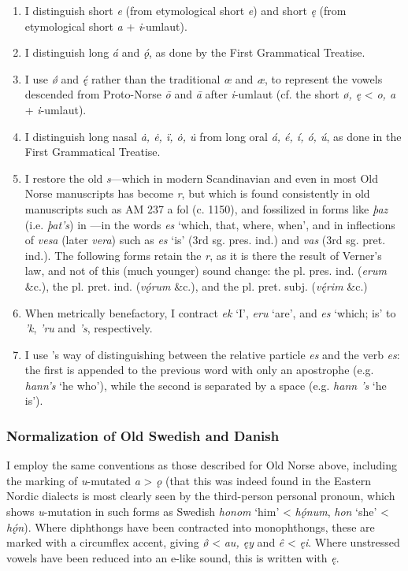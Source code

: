     \begin{enumerate}
    \item I distinguish short \emph{e} (from etymological short \emph{e}) and short \emph{ę} (from etymological short \emph{a} + \emph{i}-umlaut).
    \item I distinguish long \emph{á} and \emph{ǫ́}, as done by the First Grammatical Treatise.
    \item I use \emph{ǿ} and \emph{ę́} rather than the traditional \emph{œ} and \emph{æ}, to represent the vowels descended from Proto-Norse \emph{ō} and \emph{ā} after \emph{i}-umlaut (cf. the short \emph{ø, ę} < \emph{o, a} + \emph{i}-umlaut).
    \item I distinguish long nasal \emph{ȧ, ė, ï, ȯ, u̇} from long oral \emph{á, é, í, ó, ú}, as done in the First Grammatical Treatise.
    \item I restore the old \emph{s}—which in modern Scandinavian and even in most Old Norse manuscripts has become \emph{r}, but which is found consistently in old manuscripts such as AM 237 a fol (c. 1150), and fossilized in forms like \emph{þaz} (i.e. \emph{þat’s}) in \Regius—in the words \emph{es} ‘which, that, where, when’, and in inflections of \emph{vesa} (later \emph{vera}) such as \emph{es} ‘is’ (3rd sg. pres. ind.) and \emph{vas} (3rd sg. pret. ind.). The following forms retain the \emph{r}, as it is there the result of Verner’s law, and not of this (much younger) sound change: the pl. pres. ind. (\emph{erum} \&c.), the pl. pret. ind. (\emph{vǫ́rum} \&c.), and the pl. pret. subj. (\emph{vę́rim} \&c.)
    \item When metrically benefactory, I contract \emph{ek} ‘I’, \emph{eru} ‘are’, and \emph{es} ‘which; is’ to \emph{’k}, \emph{’ru} and \emph{’s}, respectively.
    \item I use \textcite{FinnurEdda}’s way of distinguishing between the relative particle \emph{es} and the verb \emph{es}: the first is appended to the previous word with only an apostrophe (e.g. \emph{hann’s} ‘he who’), while the second is separated by a space (e.g. \emph{hann ’s} ‘he is’).
    \end{enumerate}

    \subsubsection{Normalization of Old Swedish and Danish}
    I employ the same conventions as those described for Old Norse above, including the marking of \emph{u}-mutated \emph{a} > \emph{ǫ} (that this was indeed found in the Eastern Nordic dialects is most clearly seen by the third-person personal pronoun, which shows \emph{u}-mutation in such forms as Swedish \emph{honom} ‘him’ < \emph{hǫ́num}, \emph{hon} ‘she’ < \emph{hǫ́n}).  Where diphthongs have been contracted into monophthongs, these are marked with a circumflex accent, giving \emph{ø̂} < \emph{au, ęy} and \emph{ê} < \emph{ęi}.  Where unstressed vowels have been reduced into an e-like sound, this is written with \emph{ę}.

